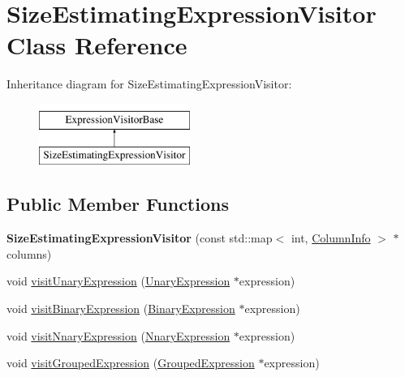 \hypertarget{class_size_estimating_expression_visitor}{\section{Size\+Estimating\+Expression\+Visitor Class Reference}
\label{class_size_estimating_expression_visitor}
}
Inheritance diagram for Size\+Estimating\+Expression\+Visitor\+:\begin{figure}[H]
\begin{center}
\leavevmode
\includegraphics[height=2.000000cm]{class_size_estimating_expression_visitor}
\end{center}
\end{figure}
\subsection*{Public Member Functions}
\begin{DoxyCompactItemize}
\item 
\hypertarget{class_size_estimating_expression_visitor_a161843e94155226df99a16ab2227a024}{{\bfseries Size\+Estimating\+Expression\+Visitor} (const std\+::map$<$ int, \hyperlink{class_column_info}{Column\+Info} $>$ $\ast$columns)}\label{class_size_estimating_expression_visitor_a161843e94155226df99a16ab2227a024}

\item 
void \hyperlink{class_size_estimating_expression_visitor_a6cbd26f2d5997577bd7f18d68f1cf866}{visit\+Unary\+Expression} (\hyperlink{class_unary_expression}{Unary\+Expression} $\ast$expression)
\item 
void \hyperlink{class_size_estimating_expression_visitor_a40a902ac926af0d18d976769abda5af3}{visit\+Binary\+Expression} (\hyperlink{class_binary_expression}{Binary\+Expression} $\ast$expression)
\item 
void \hyperlink{class_size_estimating_expression_visitor_a1eeaaf34393c7c79fd4079bf8ea97bc9}{visit\+Nnary\+Expression} (\hyperlink{class_nnary_expression}{Nnary\+Expression} $\ast$expression)
\item 
void \hyperlink{class_size_estimating_expression_visitor_a8015f22031b44cbe54579f92b7e9cc00}{visit\+Grouped\+Expression} (\hyperlink{class_grouped_expression}{Grouped\+Expression} $\ast$expression)
\end{DoxyCompactItemize}
